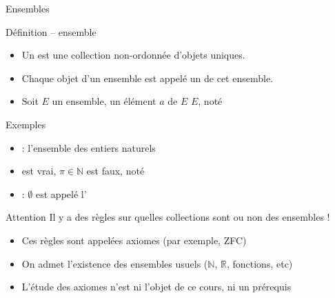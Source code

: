 
\begingroup

\begin{frame}{Ensembles}
  \begin{block}{Définition -- ensemble}
    \begin{itemize}
    \item Un  est une collection non-ordonnée d'objets uniques.
    \item Chaque objet d'un ensemble est appelé un  de cet ensemble.
    \item Soit $E$ un ensemble, un élément $a$ de $E$  $E$, noté 
    \end{itemize}
  \end{block}
  \begin{exampleblock}{Exemples}
    \begin{itemize}
    \item {} : l'ensemble des entiers naturels
    \item {} est vrai, $\pi \in \mathbb{N}$ est faux, noté 
    \item {} : $\emptyset$ est appelé l'
    \end{itemize}
  \end{exampleblock}
  \begin{alertblock}{Attention}
    Il y a des règles sur quelles collections sont ou non des ensembles !
    \begin{itemize}
    \item Ces règles sont appelées \alert{axiomes} (par exemple, ZFC)
    \item On admet l'existence des ensembles usuels ($\mathbb{N}$, $\mathbb{R}$, fonctions, etc)
    \item L'étude des axiomes n'est ni l'objet de ce cours, ni un prérequis
    \end{itemize}
  \end{alertblock}
\end{frame}
\endgroup
